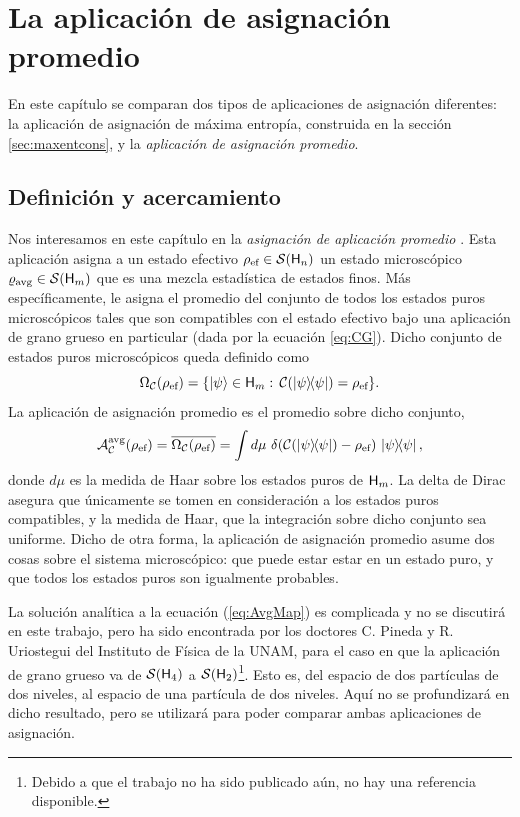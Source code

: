 \chapter{La aplicación de asignación promedio}\label{ch:5}

En este capítulo se comparan dos tipos de aplicaciones de asignación diferentes: la aplicación de asignación de máxima entropía, construida en la sección \ref{sec:maxentcons}, y la \textit{aplicación de asignación promedio}.

\section{Definición y acercamiento}

Nos interesamos en este capítulo en la \textit{asignación de aplicación promedio} \cite{Macro-To-Micro}. Esta aplicación asigna a un estado efectivo $\rho_{\text{ef}} \in \mathcal{S}({\sf H}_{n})$ un estado microscópico $\varrho_{\text{avg}} \in \mathcal{S}({\sf H}_{m})$ que es una mezcla estadística de estados finos. Más específicamente, le asigna el promedio del conjunto de todos los estados puros microscópicos tales que son compatibles con el estado efectivo bajo una aplicación de grano grueso en particular (dada por la ecuación \ref{eq:CG}). Dicho conjunto de estados puros microscópicos queda definido como
\begin{equation}\label{eq:Omega}
    \Omega_{\mcC}(\rho_{\ef}) = \{\ket{\psi}\in\hilbert_{m}:\, \mcC(\dyad{\psi}) = \rho_{\ef}  \}.
\end{equation}
La aplicación de asignación promedio es el promedio sobre dicho conjunto, \ie 
\begin{equation}\label{eq:AvgMap}
    \mcA_{\mcC}^{\avg}(\rho_{\ef}) = \overline{\Omega_{\mcC}(\rho_{\ef})} = \int d \mu\,\, \delta(\mcC(\dyad{\psi})-\rho_{\ef})\,\dyad{\psi},
\end{equation}
donde $d\mu$ es la medida de Haar sobre los estados puros de ${\sf H}_{m}$. La delta de Dirac asegura que únicamente se tomen en consideración a los estados puros compatibles, y la medida de Haar, que la integración sobre dicho conjunto sea uniforme. Dicho de otra forma, la aplicación de asignación promedio asume dos cosas sobre el sistema microscópico: que puede estar estar en un estado puro, y que todos los estados puros son igualmente probables.

La solución analítica a la ecuación (\ref{eq:AvgMap}) es complicada y no se discutirá en este trabajo, pero ha sido encontrada por los doctores C. Pineda y R. Uriostegui del Instituto de Física de la UNAM, para el caso en que la aplicación de grano grueso va de $\mathcal{S}({\sf H}_{4})$ a $\mathcal{S}({\sf H}_{2})$\footnote{Debido a que el trabajo no ha sido publicado aún, no hay una referencia disponible.}. Esto es, del espacio de dos partículas de dos niveles, al espacio de una partícula de dos niveles. Aquí no se profundizará en dicho resultado, pero se utilizará para poder comparar ambas aplicaciones de asignación.

